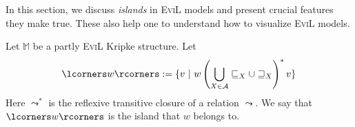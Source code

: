 In this section, we discuss \emph{islands} in \textsc{EviL} models and
present crucial features they make true.  These also help one to
understand how to visualize \textsc{EviL} models.


\begin{mydef}Let $\mathbb{M}$ be a partly \textsc{EviL} Kripke structure.  Let
\[ \lcorners w\rcorners := \{ v\ |\ w \left(\bigcup_{X \in
        \mathcal{A}}\sqsubseteq_X \cup \sqsupseteq_X\right)^\ast v
     \}\]
Here $\leadsto^\ast$ is the reflexive transitive closure of a relation
$\leadsto$.  We say that $\lcorners w \rcorners$ is the island that
$w$ belongs to.
\end{mydef}

